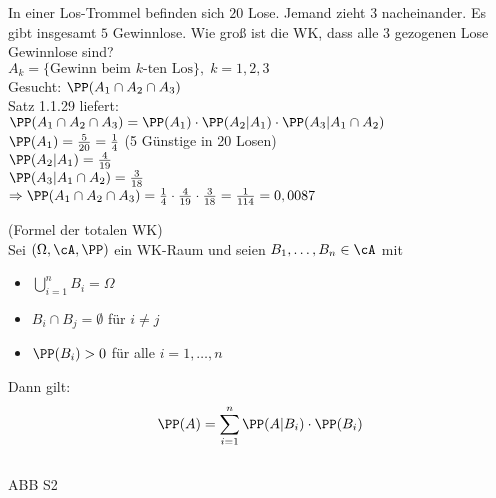  In einer Los-Trommel befinden sich $20$ Lose. Jemand zieht $3$ nacheinander. Es gibt insgesamt $5$ Gewinnlose. Wie groß ist die WK, dass alle $3$ gezogenen Lose Gewinnlose sind?\\
$A_k=\{\text{Gewinn beim $k$-ten Los}\}, \; k=1,2,3$\\
Gesucht: $\PP(A_1\cap A_2 \cap A_3)$\\
Satz 1.1.29 liefert: \\
$\PP(A_1 \cap A_2 \cap A_3)=\PP(A_1) \cdot \PP(A_2 | A_1) \cdot \PP(A_3 | A_1 \cap A_2)$\\
$\PP(A_1) = \frac{5}{20}= \frac{1}{4}$ (5 Günstige in 20 Losen)\\
$\PP(A_2 | A_1) = \frac{4}{19}$\\
$\PP(A_3 | A_1 \cap A_2) = \frac{3}{18}$\\
$\Rightarrow \PP(A_1 \cap A_2 \cap A_3)=\frac{1}{4}\cdot \frac{4}{19}\cdot \frac{3}{18}=\frac{1}{114}=0,0087$

 (Formel der totalen WK)\\
Sei $(\Omega, \cA, \PP)$ ein WK-Raum und seien $B_1,\dots,B_n \in \cA$ mit 
\begin{itemize}
\item $\bigcup_{i=1}^n B_i = \Omega$
\item $B_i \cap B_j = \emptyset $ für $i \not= j$
\item $\PP (B_i) >0$ für alle $i=1,\dots,n$
\end{itemize}
Dann gilt:
$$\PP(A) = \sum_{i=1}^n \PP(A|B_i) \cdot \PP (B_i)$$\\
ABB S2

